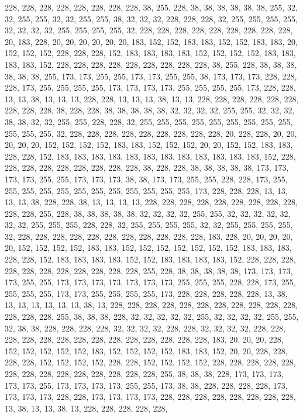 {	228, 228, 228, 228, 228, 228, 228, 228, 38,  255, 228, 38,  38,  38,  38,  38,  38,  255, 32,  32,  255, 255, 32,  32,  255, 255, 38,  32,  32,  32,  228, 228, 228, 32,  255, 255, 255, 255, 32,  32,  32,  32,  255, 255, 255, 255, 32,  228, 228, 228, 228, 228, 228, 228, 228, 228, 20,  183, 228, 20,  20,  20,  20,  20,  20,  183, 152, 152, 183, 183, 152, 152, 183, 183, 20,  152, 152, 152, 228, 228, 228, 152, 183, 183, 183, 183, 152, 152, 152, 152, 183, 183, 183, 183, 152, 228, 228, 228, 228, 228, 228, 228, 228, 228, 38,  255, 228, 38,  38,  38,  38,  38,  38,  255, 173, 173, 255, 255, 173, 173, 255, 255, 38,  173, 173, 173, 228, 228, 228, 173, 255, 255, 255, 255, 173, 173, 173, 173, 255, 255, 255, 255, 173, 228, 228, 13,  13,  38,  13,  13,  13,  228, 228, 13,  13,  13,  38,  13,  13,  228, 
	228, 228, 228, 228, 228, 228, 228, 228, 38,  228, 228, 38,  38,  38,  38,  38,  32,  32,  32,  32,  255, 255, 32,  32,  32,  38,  38,  32,  32,  255, 255, 228, 228, 32,  255, 255, 255, 255, 255, 255, 255, 255, 255, 255, 255, 255, 32,  228, 228, 228, 228, 228, 228, 228, 228, 228, 20,  228, 228, 20,  20,  20,  20,  20,  152, 152, 152, 152, 183, 183, 152, 152, 152, 20,  20,  152, 152, 183, 183, 228, 228, 152, 183, 183, 183, 183, 183, 183, 183, 183, 183, 183, 183, 183, 152, 228, 228, 228, 228, 228, 228, 228, 228, 228, 38,  228, 228, 38,  38,  38,  38,  38,  173, 173, 173, 173, 255, 255, 173, 173, 173, 38,  38,  173, 173, 255, 255, 228, 228, 173, 255, 255, 255, 255, 255, 255, 255, 255, 255, 255, 255, 255, 173, 228, 228, 228, 13,  13,  13,  13,  38,  228, 228, 38,  13,  13,  13,  13,  228, 228, 
	228, 228, 228, 228, 228, 228, 228, 228, 228, 255, 228, 38,  38,  38,  38,  38,  32,  32,  32,  32,  255, 255, 32,  32,  32,  32,  32,  32,  32,  255, 255, 255, 228, 228, 32,  255, 255, 255, 255, 32,  32,  255, 255, 255, 255, 32,  228, 228, 228, 228, 228, 228, 228, 228, 228, 228, 228, 183, 228, 20,  20,  20,  20,  20,  152, 152, 152, 152, 183, 183, 152, 152, 152, 152, 152, 152, 152, 183, 183, 183, 228, 228, 152, 183, 183, 183, 183, 152, 152, 183, 183, 183, 183, 152, 228, 228, 228, 228, 228, 228, 228, 228, 228, 228, 228, 255, 228, 38,  38,  38,  38,  38,  173, 173, 173, 173, 255, 255, 173, 173, 173, 173, 173, 173, 173, 255, 255, 255, 228, 228, 173, 255, 255, 255, 255, 173, 173, 255, 255, 255, 255, 173, 228, 228, 228, 228, 228, 13,  38,  13,  13,  13,  13,  13,  13,  38,  13,  228, 228, 228, 
	228, 228, 228, 228, 228, 228, 228, 228, 228, 228, 228, 255, 38,  38,  38,  228, 32,  32,  32,  32,  32,  255, 32,  32,  32,  32,  255, 255, 32,  38,  38,  228, 228, 228, 228, 32,  32,  32,  32,  228, 228, 32,  32,  32,  32,  228, 228, 228, 228, 228, 228, 228, 228, 228, 228, 228, 228, 228, 228, 183, 20,  20,  20,  228, 152, 152, 152, 152, 152, 183, 152, 152, 152, 152, 183, 183, 152, 20,  20,  228, 228, 228, 228, 152, 152, 152, 152, 228, 228, 152, 152, 152, 152, 228, 228, 228, 228, 228, 228, 228, 228, 228, 228, 228, 228, 228, 228, 255, 38,  38,  38,  228, 173, 173, 173, 173, 173, 255, 173, 173, 173, 173, 255, 255, 173, 38,  38,  228, 228, 228, 228, 173, 173, 173, 173, 228, 228, 173, 173, 173, 173, 228, 228, 228, 228, 228, 228, 228, 228, 13,  38,  13,  13,  38,  13,  228, 228, 228, 228, 228, 
}

